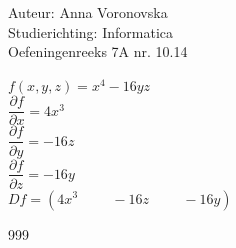 \documentclass[a4paper]{article}
\begin{document}
  
\noindent \large Auteur: Anna Voronovska \\
\noindent \large Studierichting: Informatica\\
\noindent \large Oefeningenreeks 7A nr. 10.14\\

\medskip

\normalsize


$f(x,y,z) = x^4 - 16yz$\\

$\dfrac{\partial f}{\partial x} = 4x^3$\\

$\dfrac{\partial f}{\partial y} = -16z$\\

$\dfrac{\partial f}{\partial z} = -16y$\\

$Df = (4x^3 \hspace{1cm} -16z \hspace{1cm} -16y)$\\



\begin{thebibliography}{999}
\end{thebibliography}
\end{document}
